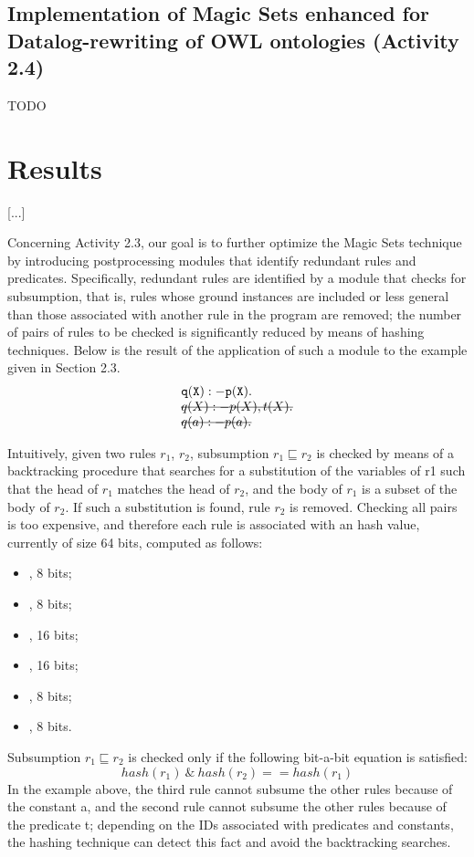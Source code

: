 \documentclass[oneside]{book}
\newcommand{\stkout}[1]{\ifmmode\text{\sout{\ensuremath{#1}}}\else\sout{#1}\fi}
\begin{document}
\section{Implementation of Magic Sets enhanced for Datalog-rewriting of OWL ontologies (Activity 2.4)}

TODO


\chapter{Results}
[...]

Concerning Activity 2.3, our goal is to further optimize the Magic Sets technique by introducing postprocessing modules that identify redundant rules and predicates. Specifically, redundant rules are identified by a module that checks for subsumption, that is, rules whose ground instances are included or less general than those associated with another rule in the program are removed; the number of pairs of rules to be checked is significantly reduced by means of hashing techniques. Below is the result of the application of such a module to the example given in Section 2.3. 
\[
\begin{array}{l}
{\tt q(X) :- p(X).}\\
\mathtt{\stkout{q(X) :- p(X), t(X).}}\\
\mathtt{\stkout{ q(a) :- p(a).}}\\
\end{array}
\]


Intuitively, given two rules $r_1$, $r_2$, subsumption $r_1 \sqsubseteq r_2$ is checked by means of a backtracking procedure that searches for a substitution of the variables of r1 such that the head of $r_1$ matches the head of $r_2$, and the body of $r_1$ is a subset of the body of $r_2$. If such a substitution is found, rule  $r_2$ is removed. Checking all pairs is too expensive, and therefore each rule is associated with an hash value, currently of size 64 bits, computed as follows:
\begin{itemize}
\item <OR of IDs of head predicates>, 8 bits;
\item <OR of IDs of head constants>, 8 bits;
\item <OR of IDs of predicates in positive body>, 16 bits;
\item <OR of IDs of constants in positive body>, 16 bits;
\item <OR of IDs of predicates in negative body>, 8 bits;
\item <OR of IDs of constants in negative body>, 8 bits.
\end{itemize}
Subsumption $r_1 \sqsubseteq r_2$ is checked only if the following bit-a-bit equation is satisfied:
$$hash(r_1) \ \& \ hash(r_2) == hash(r_1)$$
In the example above, the third rule cannot subsume the other rules because of the constant a, and the second rule cannot subsume the other rules because of the predicate t; depending on the IDs associated with predicates and constants, the hashing technique can detect this fact and avoid the backtracking searches.
\end{document}
